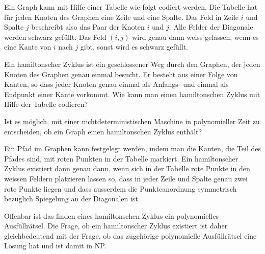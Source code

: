 Ein Graph kann mit Hilfe einer Tabelle wie folgt codiert werden.
Die Tabelle hat für jeden Knoten des Graphen eine Zeile und eine Spalte.
Das Feld in Zeile $i$ und Spalte $j$ beschreibt also das Paar der
Knoten $i$ und $j$.
Alle Felder der Diagonale werden schwarz gefüllt.
Das Feld $(i,j)$  wird genau dann weiss gelassen,
wenn es eine Kante von $i$ nach $j$ gibt, sonst wird es schwarz gefüllt.

\begin{center}
\end{center}


\begin{teilaufgaben}
\item
Ein hamiltonscher Zyklus ist ein geschlossener Weg durch den Graphen, der
jeden Knoten des Graphen genau einmal besucht.
Er besteht aus einer Folge von Kanten, so dass jeder Knoten genau 
einmal als Anfangs- und einmal als Endpunkt einer Kante vorkommt.
Wie kann man einen hamiltonschen Zyklus mit Hilfe der Tabelle codieren?
\item
Ist es möglich, mit einer nichtdeterministischen Maschine in polynomieller
Zeit zu entscheiden, ob ein Graph einen hamiltonschen Zyklus enthält?
\end{teilaufgaben}

\begin{loesung}
\begin{teilaufgaben}
\item
Ein Pfad im Graphen kann festgelegt werden, indem man die Kanten, die Teil
des Pfades sind, mit roten Punkten in der Tabelle markiert.
Ein hamiltonscher Zyklus existiert dann genau dann, wenn sich in der Tabelle
rote Punkte in den weissen Feldern platzieren lassen so, dass in jeder
Zeile und Spalte genau zwei rote Punkte liegen und dass ausserdem die
Punkteanordnung symmetrisch bezüglich Spiegelung an der Diagonalen ist.
\item
Offenbar ist das finden eines hamiltonschen Zyklus ein polynomielles
Ausfüllrätsel.
Die Frage, ob ein hamiltonscher Zyklus existiert ist daher gleichbedeutend
mit der Frage, ob das zugehörige polynomielle Ausfüllrätsel eine Lösung hat
und ist damit in NP.
\qedhere
\end{teilaufgaben}
\end{loesung}

